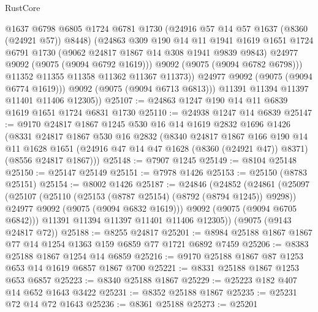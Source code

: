 \begin{lexlean}{RustCore}
\begin{coremodule}
                  @1637
                  @6798
                  @6805
                  @1724
                  @6781
                  @1730
                  (@24916 @57 @14 @57 @1637 (@8360 (@24921 @57)) @8448)
                  (@24863
                    @309
                    @190
                    @14
                    @11
                    @1941
                    @1619
                    @1651
                    @1724
                    @6791
                    @1730
                    (@9062 @24817 @1867 @14 @308 @1941 @9839 @9843)
                    @24977
                    @9092
                    (@9075 (@9094 @6792 @1619)))
                  @9092
                  (@9075 (@9094 @6782 @6798)))
                @11352
                @11355
                @11358
                @11362
                @11367
                @11373))
            @24977
            @9092
            (@9075 (@9094 @6774 @1619)))
          @9092
          (@9075 (@9094 @6713 @6813)))
        @11391
        @11394
        @11397
        @11401
        @11406
        @12305))
@25107 := @24863 @1247 @190 @14 @11 @6839 @1619 @1651 @1724 @6831 @1730
@25110 := @24938 @1247 @14 @6839
@25147 := @9170
    @24817
    @1867
    @1245
    @530
    @16
    @14
    @1619
    @2832
    @1696
    @1426
    (@8331
      @24817
      @1867
      @530
      @16
      @2832
      (@8340
        @24817
        @1867
        @166
        @190
        @14
        @11
        @1628
        @1651
        (@24916 @47 @14 @47 @1628 (@8360 (@24921 @47)) @8371)
        (@8556 @24817 @1867)))
@25148 := @7907 @1245
@25149 := @8104 @25148
@25150 := @25147 @25149
@25151 := @7978 @1426
@25153 := @25150 (@8783 @25151)
@25154 := @8002 @1426
@25187 := @24846
    (@24852
      (@24861
        (@25097
          (@25107
            (@25110 (@25153 (@8787 @25154) (@8792 (@8794 @1245)) @9298))
            @24977
            @9092
            (@9075 (@9094 @6832 @1619)))
          @9092
          (@9075 (@9094 @6705 @6842)))
        @11391
        @11394
        @11397
        @11401
        @11406
        @12305))
    (@9075 (@9143 @24817 @72))
@25188 := @8255 @24817
@25201 := @8984 @25188 @1867 @1867 @77 @14 @1254 @1363 @159 @6859 @77 @1721 @6892 @7459
@25206 := @8383 @25188 @1867 @1254 @14 @6859
@25216 := @9170 @25188 @1867 @87 @1253 @653 @14 @1619 @6857 @1867 @700
@25221 := @8331 @25188 @1867 @1253 @653 @6857
@25223 := @8340 @25188 @1867
@25229 := @25223 @182 @407 @14 @652 @1643 @3422
@25231 := @8352 @25188 @1867
@25235 := @25231 @72 @14 @72 @1643
@25236 := @8361 @25188
@25273 := @25201

\end{coremodule}
\end{lexlean}
